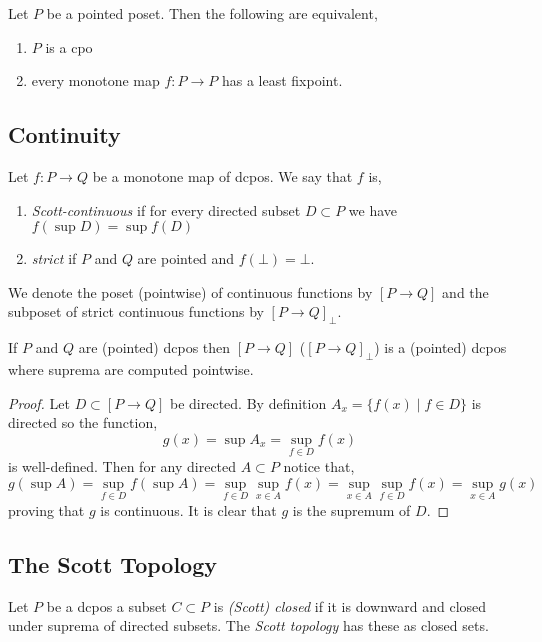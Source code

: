 \documentclass[12pt]{article}
\begin{document}
\begin{prop}
Let $P$ be a pointed poset. Then the following are equivalent,
\begin{enumerate}
\item $P$ is a cpo
\item every monotone map $f : P \to P$ has a least fixpoint.  
\end{enumerate}
\end{prop}

\subsection{Continuity}

\begin{defn}
Let $f : P \to Q$ be a monotone map of dcpos. We say that $f$ is,
\begin{enumerate}
\item \textit{Scott-continuous} if for every directed subset $D \subset P$ we have $f(\sup D) = \sup f(D)$
\item \textit{strict} if $P$ and $Q$ are pointed and $f(\bot) = \bot$.
\end{enumerate}
We denote the poset (pointwise) of continuous functions by $[P \to Q]$ and the subposet of strict continuous functions by $[P \to Q]_{\bot}$.
\end{defn}

\begin{prop}
If $P$ and $Q$ are (pointed) dcpos then $[P \to Q]$ ($[P \to Q]_{\bot}$) is a (pointed) dcpos where suprema are computed pointwise. 
\end{prop}

\begin{proof}
Let $D \subset [P \to Q]$ be directed. By definition $A_x = \{ f(x) \mid f \in D \}$ is directed so the function,
\[ g(x) = \sup A_x = \sup_{f \in D} f(x) \]
is well-defined. Then for any directed $A \subset P$ notice that,
\[ g(\sup A) = \sup_{f \in D} f(\sup A) = \sup_{f \in D} \sup_{x \in A} f(x) = \sup_{x \in A} \sup_{f \in D} f(x) = \sup_{x \in A} g(x) \]
proving that $g$ is continuous. It is clear that $g$ is the supremum of $D$. 
\end{proof}

\subsection{The Scott Topology}

\begin{defn}
Let $P$ be a dcpos a subset $C \subset P$ is \textit{(Scott) closed} if it is downward and closed under suprema of directed subsets. The \textit{Scott topology} has these as closed sets.  
\end{defn}
\end{document}

